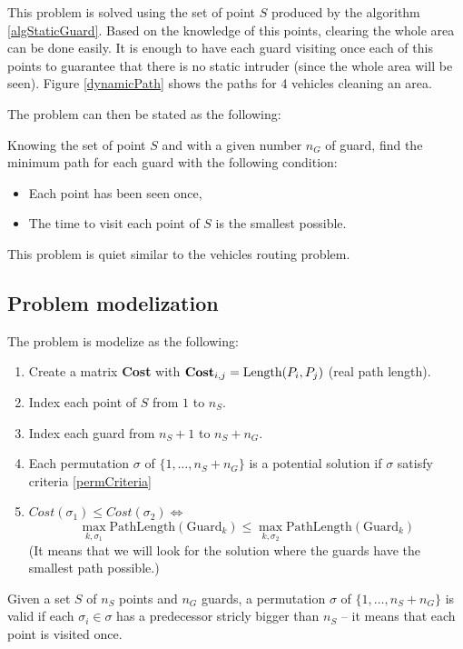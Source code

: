 This problem is solved using the set of point $S$ produced by the algorithm \ref{algStaticGuard}. Based on the knowledge of this points, clearing the whole area can be done easily. It is enough to have each guard visiting once each of this points to guarantee that there is no static intruder (since the whole area will be seen). Figure \ref{dynamicPath} shows the paths for 4 vehicles cleaning an area.

The problem can then be stated as the following:

\begin{subproblem}
 Knowing the set of point $S$ and with a given number $n_{G}$ of guard, find the minimum path for each guard with the following condition:
 \begin{itemize}
  \item Each point has been seen once,
  \item The time to visit each point of $S$ is the smallest possible.
 \end{itemize}
This problem is quiet similar to the vehicles routing problem.
\label{subProb3}
\end{subproblem}

\subsection{Problem modelization}

The problem is modelize as the following:

\begin{enumerate}
  \item Create a matrix \textbf{Cost} with $\text{\textbf{Cost}}_{i,j} = \text{Length}(P_i,P_j)$ (real path length).
  \item Index each point of $S$ from $1$ to $n_{S}$.
  \item Index each guard from $n_{S}+1$ to $ n_{S}+n_{G}$.
  \item Each permutation $\sigma$ of $\{1,\hdots,n_{S}+n_{G}\}$ is a potential solution if $\sigma$ satisfy criteria \ref{permCriteria}
  \item $Cost(\sigma_1) \leq Cost(\sigma_2) \Longleftrightarrow$ $$\max_{k,\sigma_1}\text{PathLength}(\text{Guard}_k) \leq \max_{k,\sigma_2}\text{PathLength}(\text{Guard}_k)$$
  (It means that we will look for the solution where the guards have the smallest path possible.)
\end{enumerate}

\begin{criteria}
 Given a set $S$ of $n_S$ points and $n_G$ guards, a permutation $\sigma$ of $\{1,\hdots,n_S+n_G\}$ is valid if each $\sigma_i \in \sigma$ has a predecessor stricly bigger than $n_S$  -- it means that each point is visited once.
 \label{permCriteria}
\end{criteria}


